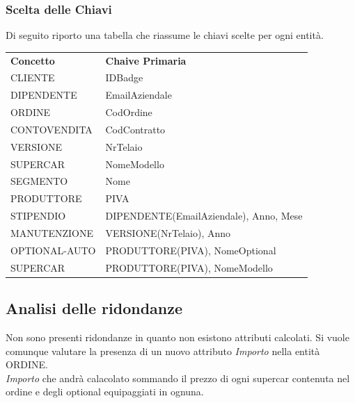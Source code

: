 \documentclass[11pt]{article}
\begin{document}
\subsubsection{Scelta delle Chiavi}

Di seguito riporto una tabella che riassume le chiavi scelte per ogni entità.

\begin{center}
    \begin{table}[htbp]
        \centering
        \small
        \begin{tabularx}{\textwidth}{l l}
            \rowcolor{red!20!}
            \textbf{Concetto} & \textbf{Chaive Primaria}\\
            CLIENTE & IDBadge \\
            DIPENDENTE & EmailAziendale \\
            ORDINE & CodOrdine \\
            CONTOVENDITA & CodContratto \\
            VERSIONE & NrTelaio \\
            SUPERCAR & NomeModello \\
            SEGMENTO & Nome \\
            PRODUTTORE & PIVA \\
            STIPENDIO & DIPENDENTE(EmailAziendale), Anno, Mese \\
            MANUTENZIONE & VERSIONE(NrTelaio), Anno \\
            OPTIONAL-AUTO & PRODUTTORE(PIVA), NomeOptional \\
            SUPERCAR & PRODUTTORE(PIVA), NomeModello \\
        \end{tabularx}
    \end{table}    
\end{center}

\newpage

\subsection{Analisi delle ridondanze}

Non sono presenti ridondanze in quanto non esistono attributi calcolati. Si
vuole comunque valutare la presenza di un nuovo attributo \textit{Importo} nella entità ORDINE. \\
\textit{Importo} che andrà calacolato sommando il prezzo di
ogni supercar contenuta nel ordine e degli optional equipaggiati in ognuna.
\end{document}
